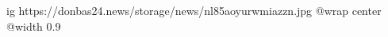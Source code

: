  
 
 
 
 

\ifcmt
  ig https://donbas24.news/storage/news/nl85aoyurwmiazzn.jpg
  @wrap center
  @width 0.9
\fi
